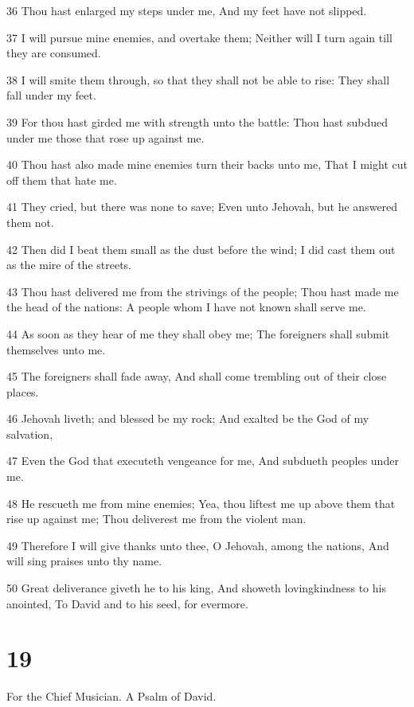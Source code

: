 \par 36 Thou hast enlarged my steps under me, And my feet have not slipped.
\par 37 I will pursue mine enemies, and overtake them; Neither will I turn again till they are consumed.
\par 38 I will smite them through, so that they shall not be able to rise: They shall fall under my feet.
\par 39 For thou hast girded me with strength unto the battle: Thou hast subdued under me those that rose up against me.
\par 40 Thou hast also made mine enemies turn their backs unto me, That I might cut off them that hate me.
\par 41 They cried, but there was none to save; Even unto Jehovah, but he answered them not.
\par 42 Then did I beat them small as the dust before the wind; I did cast them out as the mire of the streets.
\par 43 Thou hast delivered me from the strivings of the people; Thou hast made me the head of the nations: A people whom I have not known shall serve me.
\par 44 As soon as they hear of me they shall obey me; The foreigners shall submit themselves unto me.
\par 45 The foreigners shall fade away, And shall come trembling out of their close places.
\par 46 Jehovah liveth; and blessed be my rock; And exalted be the God of my salvation,
\par 47 Even the God that executeth vengeance for me, And subdueth peoples under me.
\par 48 He rescueth me from mine enemies; Yea, thou liftest me up above them that rise up against me; Thou deliverest me from the violent man.
\par 49 Therefore I will give thanks unto thee, O Jehovah, among the nations, And will sing praises unto thy name.
\par 50 Great deliverance giveth he to his king, And showeth lovingkindness to his anointed, To David and to his seed, for evermore.

\chapter{19}

\par For the Chief Musician. A Psalm of David.

